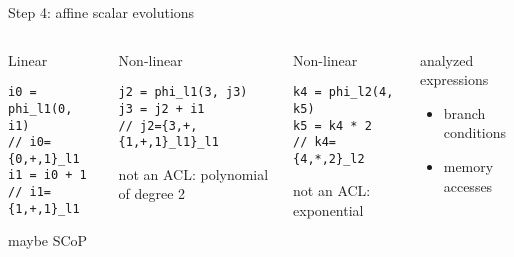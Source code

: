 \documentclass{beamer}
\begin{document}
\begin{frame}[fragile]{Step 4: affine scalar evolutions}
  \begin{columns}[T,onlytextwidth] %
    \begin{block}{\small Linear}
      \begin{lstlisting}
i0 = phi_l1(0, i1)
// i0={0,+,1}_l1
i1 = i0 + 1
// i1={1,+,1}_l1
      \end{lstlisting}

      {\small \color{myblue} maybe SCoP}
    \end{block}
    \pause
    \begin{block}{\small Non-linear} 
      \begin{lstlisting}
j2 = phi_l1(3, j3)
j3 = j2 + i1
// j2={3,+,{1,+,1}_l1}_l1
      \end{lstlisting}
      {\small \color{myred} not an ACL: polynomial of degree 2}
    \end{block}
    \pause
    \begin{block}{\small Non-linear} 
      \begin{lstlisting}
k4 = phi_l2(4, k5)
k5 = k4 * 2
// k4={4,*,2}_l2
      \end{lstlisting}
      {\small \color{myred} not an ACL: exponential}
    \end{block}

    \vspace{.5cm}
    \pause
    \begin{block}{\small analyzed expressions}
      \begin{itemize}
      \item branch conditions
      \item memory accesses
      \end{itemize}
    \end{block}
  \end{columns}
\end{frame}
\end{document}
